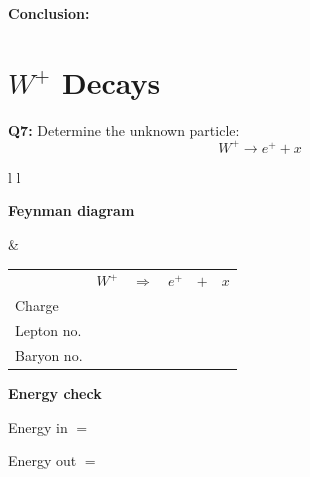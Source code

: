 \documentclass[12pt]{article}
\begin{document}
\vspace{0.5cm}

\textbf{Conclusion:}

\vspace{2.5cm}


\section*{$W^+$ Decays}


\textbf{Q7:} Determine the unknown particle:
\[
W^+ \rightarrow e^+ + x
\]

\vspace{0.5cm}

\begin{tabular}{l l}

\begin{minipage}[t]{0.46\textwidth}
\vspace{0pt}
\textbf{Feynman diagram}

\vspace{0.6cm}

\begin{tikzpicture}
\begin{feynman}
  \vertex (W) at (0,2) {};
  \vertex [coordinate] (v) at (3,2) {};

  \vertex (ep) at (4,4) {\(e^+\)};
  \vertex (x)  at (5,3) {\(x\)};

  \diagram*{
    (W) -- [boson, edge label=\(W^+\), momentum'={}] (v),
    (v) -- [fermion] (ep),
    (v) -- [fermion] (x),
  };
\end{feynman}
\end{tikzpicture}
\end{minipage}
&
\begin{minipage}[t]{0.50\textwidth}
\vspace{0pt}

\renewcommand{\arraystretch}{1.4}
\begin{tabular}{@{}l c c c c c@{}}
 & \(W^+\) & \(\Rightarrow\) & \(e^+\) & \(+\) & \(x\) \\
Charge &  &  &  &  &  \\
Lepton no. &  &  &  &  &  \\
Baryon no. &  &  &  &  &  \\
\end{tabular}

\vspace{0.6cm}

\textbf{Energy check}

Energy in $=$

Energy out $=$

\end{minipage}

\end{tabular}
\end{document}
